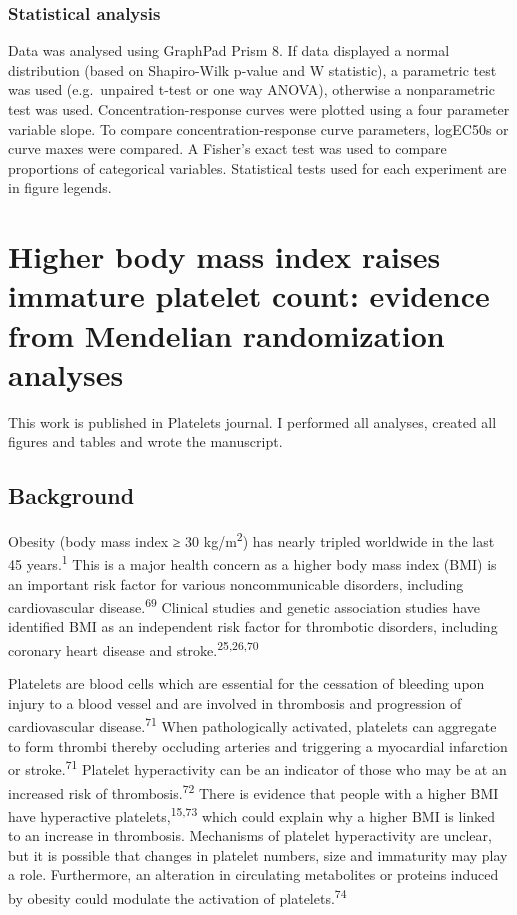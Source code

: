 \documentclass[11pt,twoside]{bristolthesis}
\begin{document}
\hypertarget{statistical-analysis}{%
\subsection{Statistical analysis}\label{statistical-analysis}}

Data was analysed using GraphPad Prism 8. If data displayed a normal distribution (based on Shapiro-Wilk p-value and W statistic), a parametric test was used (e.g.~unpaired t-test or one way ANOVA), otherwise a nonparametric test was used. Concentration-response curves were plotted using a four parameter variable slope. To compare concentration-response curve parameters, logEC50s or curve maxes were compared. A Fisher's exact test was used to compare proportions of categorical variables. Statistical tests used for each experiment are in figure legends.

\hypertarget{BMI-platelets-INTERVAL}{%
\chapter{Higher body mass index raises immature platelet count: evidence from Mendelian randomization analyses}\label{BMI-platelets-INTERVAL}}

This work is published in Platelets journal. I performed all analyses, created all figures and tables and wrote the manuscript.

\hypertarget{background-1}{%
\section{Background}\label{background-1}}

Obesity (body mass index ≥ 30 kg/m\textsuperscript{2}) has nearly tripled worldwide in the last 45 years.\textsuperscript{1} This is a major health concern as a higher body mass index (BMI) is an important risk factor for various noncommunicable disorders, including cardiovascular disease.\textsuperscript{69} Clinical studies and genetic association studies have identified BMI as an independent risk factor for thrombotic disorders, including coronary heart disease and stroke.\textsuperscript{25,26,70}

Platelets are blood cells which are essential for the cessation of bleeding upon injury to a blood vessel and are involved in thrombosis and progression of cardiovascular disease.\textsuperscript{71} When pathologically activated, platelets can aggregate to form thrombi thereby occluding arteries and triggering a myocardial infarction or stroke.\textsuperscript{71} Platelet hyperactivity can be an indicator of those who may be at an increased risk of thrombosis.\textsuperscript{72} There is evidence that people with a higher BMI have hyperactive platelets,\textsuperscript{15,73} which could explain why a higher BMI is linked to an increase in thrombosis. Mechanisms of platelet hyperactivity are unclear, but it is possible that changes in platelet numbers, size and immaturity may play a role. Furthermore, an alteration in circulating metabolites or proteins induced by obesity could modulate the activation of platelets.\textsuperscript{74}
\end{document}
